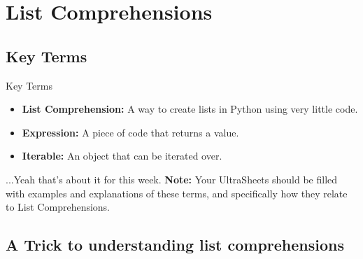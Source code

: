 \documentclass[hyperref={colorlinks,citecolor=blue,linkcolor=blue,urlcolor=blue}]{beamer}
\begin{document}
\section{List Comprehensions}

\subsection{Key Terms}
\begin{frame}{Key Terms}
  \begin{itemize}
    \item \textbf{List Comprehension:} A way to create lists in Python using very little code. 
    \item \textbf{Expression:} A piece of code that returns a value.
    \item \textbf{Iterable:} An object that can be iterated over.
    \end{itemize}
    ...Yeah that's about it for this week. 
    \textbf{Note:} Your UltraSheets\texttrademark{} should be filled with examples and explanations of these terms, and specifically how they relate to List Comprehensions.
\end{frame}


\subsection{A Trick to understanding list comprehensions}
\end{document}
